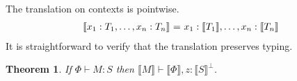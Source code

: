 \documentclass{easychair}
\makeatletter
\newtheorem{theorem}{Theorem}
\newcommand{\ba}{\begin{array}}
\newcommand{\ea}{\end{array}}
\newenvironment{equations}{\[\ba{@{}r@{~}c@{~}l@{}}}{\ea\]}
\newcommand{\key}{\mathsf}
\newcommand{\gvOutputType}[2]{![{#1}].{#2}}
\newcommand{\gvInputType}[2]{?[{#1}].{#2}}
\newcommand{\cpj}[2]{{#1} \vdash {#2}}
\newcommand{\gvj}[3]{{#1} \vdash {#2} : {#3}}
\newcommand{\gvSendType}[2]{\key{sendType}~{#1}~{#2}}
\newcommand{\gvReceiveType}[1]{\key{receiveType}~{#1}}
\newcommand{\cpLink}[2]{{#1} \leftrightarrow {#2}}
\newcommand{\cpCut}[3]{\nu {#1}.({#2} \mid {#3})}
\newcommand{\cpSendType}[3]{{#1}[{#2}].{#3}}
\newcommand{\cpReceiveType}[3]{{#1}({#2}).{#3}}
\newcommand{\cpDual}[1]{{#1}^\bot}
\newcommand{\cpExists}[2]{\exists {#1}.{#2}}
\newcommand{\cpForall}[2]{\forall {#1}.{#2}}
\newcommand{\FV}[1]{\mathit{FV}(#1)}
\newcommand{\subst}[3]{{#1}[{#2}/{#3}]}
\newcommand{\hgvcp}[1]{\llbracket{#1}\rrbracket}
\makeatother
\begin{document}

The translation on contexts is pointwise.
\begin{equations}
\hgvcp{x_1:T_1, \dots, x_n:T_n} &=& x_1:\hgvcp{T_1}, \dots, x_n:\hgvcp{T_n} \\
\end{equations}%
It is straightforward to verify that the translation preserves typing.
\begin{theorem}
If $\gvj{\Phi}{M}{S}$ then $\cpj{\hgvcp{M}}{\hgvcp{\Phi},z:\cpDual{\hgvcp{S}}}$.
\end{theorem}
\end{document}
